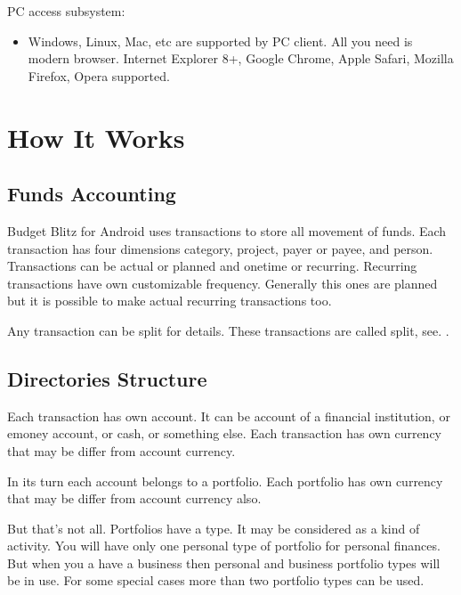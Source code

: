 \documentclass[a4paper,10pt,english]{sphinxmanual}
\begin{document}
\sphinxAtStartPar
PC access subsystem:
\begin{itemize}
\item {} 
\sphinxAtStartPar
Windows, Linux, Mac, etc are supported by PC client. All you need is modern browser. Internet Explorer 8+, Google Chrome, Apple Safari, Mozilla Firefox, Opera supported.

\end{itemize}

\sphinxstepscope


\chapter{How It Works}
\label{\detokenize{intro:how-it-works}}\label{\detokenize{intro::doc}}

\section{Funds Accounting}
\label{\detokenize{intro:funds-accounting}}
\sphinxAtStartPar
Budget Blitz for Android uses transactions to store all movement of funds. Each transaction has
four dimensions category, project, payer or payee, and person. Transactions can be
actual or planned and onetime or recurring. Recurring transactions have own customizable frequency. Generally
this ones are planned but it is possible to make actual recurring transactions too.

\sphinxAtStartPar
Any transaction can be split for details. These transactions are called split, see. {\hyperref[\detokenize{glossary:term-split}]{}}.


\section{Directories Structure}
\label{\detokenize{intro:directories-structure}}
\sphinxAtStartPar
Each transaction has own account. It can be account of a financial institution, or e\sphinxhyphen{}money account, or cash,
or something else. Each transaction has own currency that may be differ from account currency.

\sphinxAtStartPar
In its turn each account belongs to a portfolio. Each portfolio has own currency that may be differ from account currency also.

\sphinxAtStartPar
But that’s not all. Portfolios have a type. It may be considered as a kind of activity. You will have only one
personal type of portfolio for personal finances. But when you a have a business then personal and
business portfolio types will be in use. For some special cases more than two portfolio types can be used.
\end{document}
